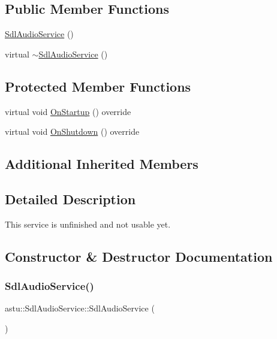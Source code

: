 \subsection*{Public Member Functions}
\begin{DoxyCompactItemize}
\item 
\hyperlink{classastu_1_1SdlAudioService_a01e328824751cf8cb5b425645767413f}{Sdl\+Audio\+Service} ()
\item 
virtual \hyperlink{classastu_1_1SdlAudioService_a9cbceaac1e0ee494080df9b0b7b6195c}{$\sim$\+Sdl\+Audio\+Service} ()
\end{DoxyCompactItemize}
\subsection*{Protected Member Functions}
\begin{DoxyCompactItemize}
\item 
virtual void \hyperlink{classastu_1_1SdlAudioService_a1138e9e9ab37cbc78e37a6e529561c3b}{On\+Startup} () override
\item 
virtual void \hyperlink{classastu_1_1SdlAudioService_a9b0b73d7de890d5fa639e5c621176128}{On\+Shutdown} () override
\end{DoxyCompactItemize}
\subsection*{Additional Inherited Members}


\subsection{Detailed Description}
This service is unfinished and not usable yet. 

\subsection{Constructor \& Destructor Documentation}
\mbox{\label{classastu_1_1SdlAudioService_a01e328824751cf8cb5b425645767413f}} 
\subsubsection{\texorpdfstring{Sdl\+Audio\+Service()}{SdlAudioService()}}
{\footnotesize\ttfamily astu\+::\+Sdl\+Audio\+Service\+::\+Sdl\+Audio\+Service (\begin{DoxyParamCaption}{ }\end{DoxyParamCaption})}

